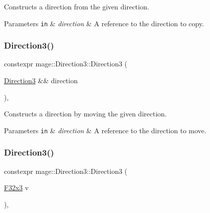 Constructs a direction from the given direction.


\begin{DoxyParams}[1]{Parameters}
\mbox{\tt in}  & {\em direction} & A reference to the direction to copy. \\
\hline
\end{DoxyParams}
\mbox{\label{structmage_1_1_direction3_aff1506b32f2b6dd49c2747eca90c76ce}} 
\subsubsection{\texorpdfstring{Direction3()}{Direction3()}\hspace{0.1cm}{\footnotesize\ttfamily [4/5]}}
{\footnotesize\ttfamily constexpr mage\+::\+Direction3\+::\+Direction3 (\begin{DoxyParamCaption}\item[{\mbox{\hyperlink{structmage_1_1_direction3}{Direction3}} \&\&}]{direction }\end{DoxyParamCaption})\hspace{0.3cm}{\ttfamily [default]}, {\ttfamily [noexcept]}}

Constructs a direction by moving the given direction.


\begin{DoxyParams}[1]{Parameters}
\mbox{\tt in}  & {\em direction} & A reference to the direction to move. \\
\hline
\end{DoxyParams}
\mbox{\label{structmage_1_1_direction3_a9ef3fe2fd9fd55fade378d42eda597c3}} 
\subsubsection{\texorpdfstring{Direction3()}{Direction3()}\hspace{0.1cm}{\footnotesize\ttfamily [5/5]}}
{\footnotesize\ttfamily constexpr mage\+::\+Direction3\+::\+Direction3 (\begin{DoxyParamCaption}\item[{\mbox{\hyperlink{namespacemage_a1e3c7a882af461f161caa1cbddaf1fa2}{F32x3}}}]{v }\end{DoxyParamCaption})\hspace{0.3cm}{\ttfamily [explicit]}, {\ttfamily [noexcept]}}

